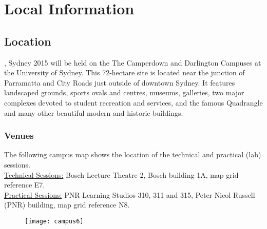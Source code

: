 {}
\section*{Local Information}
%
%
{}
\subsection*{Location}
\mlss, Sydney 2015 will be held on the The Camperdown and Darlington Campuses at the University of Sydney. 
This 72-hectare site is located near the junction of Parramatta and City Roads just outside of downtown Sydney. It features landscaped grounds, sports ovals and centres, museums, galleries, two major complexes devoted to student recreation and services, and the famous Quadrangle and many other beautiful modern and historic buildings.  
%
\subsubsection*{Venues}
The following campus map shows the location of the  technical  and  practical (lab) sessions. \\ 
%
\underline{Technical Sessions:}
%
Bosch Lecture Theatre 2, Bosch building 1A,  map grid reference E7. \\
%
\underline{Practical Sessions:}
PNR Learning Studios 310, 311 and 315, Peter Nicol Russell (PNR) building, map grid reference N8.
%
\begin{figure}[h!]
\texttt{[image: campus6]}
\end{figure}

\clearpage


{}
